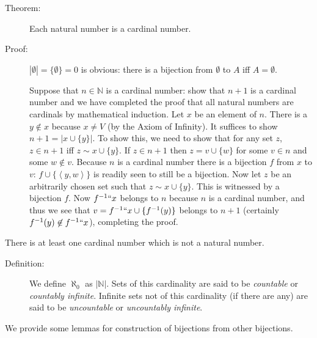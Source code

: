 \documentclass[12pt]{book}
\begin{document}
\begin{description}

\item[Theorem:]  Each natural number is a cardinal number.

\item[Proof:]  $|\emptyset| = \{\emptyset\}=0$ is obvious:  there is a bijection from $\emptyset$ to $A$ iff $A = \emptyset$.

 Suppose that $n \in {\mathbb N}$ is a cardinal number: show that
$n+1$ is a cardinal number and we have completed the proof that all
natural numbers are cardinals by mathematical induction.  Let $x$ be
an element of $n$.  There is a $y \not\in x$ because $x \neq V$ (by
the Axiom of Infinity).  It suffices to show $n+1 = |x \cup \{y\}|$.
To show this, we need to show that for any set $z$, $z \in n+1$ iff $z
\sim x\cup \{y\}$.  If $z \in n+1$ then $z = v \cup \{w\}$ for some $v
\in n$ and some $w \not\in v$.  Because $n$ is a cardinal number there
is a bijection $f$ from $x$ to $v$: $f \cup \{\left<y,w\right>\}$ is
readily seen to still be a bijection.  Now let $z$ be an arbitrarily
chosen set such that $z \sim x \cup \{y\}$.  This is witnessed by a
bijection $f$.  Now $f^{-1}``x$ belongs to $n$ because $n$ is a
cardinal number, and thus we see that $v = f^{-1}``x \cup
\{f^{-1}(y)\}$ belongs to $n+1$ (certainly $f^{-1}(y) \not\in f^{-1}``x$), completing the proof.

\end{description}

There is at least one cardinal number which is not a natural number.

\begin{description}

\item[Definition:] We define $\aleph_0$ as $|{\mathbb N}|$.  Sets of
this cardinality are said to be {\em countable\/} or {\em countably
infinite\/}.  Infinite sets not of this cardinality (if there are any)
are said to be {\em uncountable\/} or {\em uncountably infinite\/}.

\end{description}

We provide some lemmas for construction of bijections from other bijections.
\end{document}
